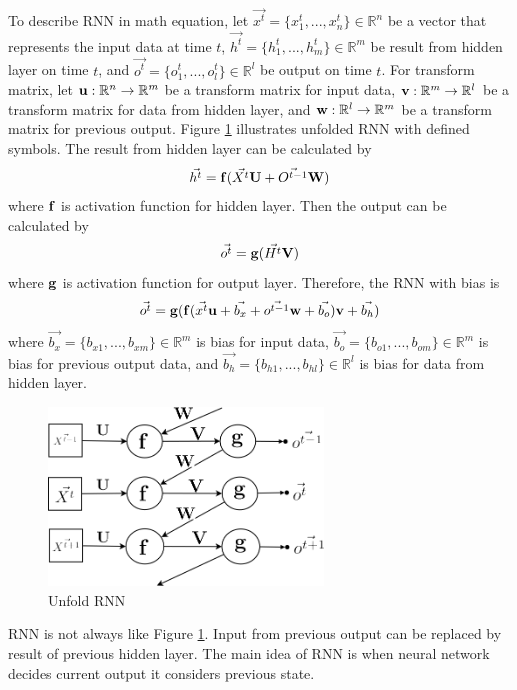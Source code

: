 \documentclass[draft,dvipsnames]{drexel-thesis}
\begin{document}
\begin{thesis}
	To describe RNN in math equation, let $\vec{x^t} = \{ x_1^t, ..., x_n^t\} \in \mathbb{R}^n$ be a vector that represents the input data at time $t$, $\vec{h^t} = \{ h_1^t, ..., h_m^t\} \in \mathbb{R}^m$ be result from hidden layer on time $t$, and $\vec{o^t} = \{ o_1^t, ..., o_l^t\} \in \mathbb{R}^l$ be output on time $t$. For transform matrix, let $\bold{u}: \mathbb{R}^n \rightarrow \mathbb{R}^m$ be a transform matrix for input data, $\bold{v}: \mathbb{R}^m \rightarrow \mathbb{R}^l$ be a transform matrix for data from hidden layer, and $\bold{w}: \mathbb{R}^l \rightarrow \mathbb{R}^m$ be a transform matrix for previous output. Figure \ref{fig:unfold_RNN} illustrates unfolded RNN with defined symbols. The result from hidden layer can be calculated by 
	$$\vec{h^t} = \bold{f}(\vec{X^t}\bold{U} + \vec{O^{t-1}}\bold{W})$$ where $\bold{f}$ is activation function for hidden layer. Then the output can be calculated by
	$$\vec{o^t} = \bold{g}(\vec{H^t}\bold{V})$$ where $\bold{g}$ is activation function for output layer. Therefore, the RNN with bias is
	$$\vec{o^t} = \bold{g}(\bold{f}(\vec{x^t}\bold{u}+\vec{b_x} + \vec{o^{t-1}}\bold{w}+\vec{b_o})\bold{v}+\vec{b_h})$$ where $\vec{b_x} = \{b_{x1}, ..., b_{xm}\} \in \mathbb{R}^m$ is bias for input data, $\vec{b_o} = \{b_{o1}, ..., b_{om}\} \in \mathbb{R}^m$ is bias for previous output data, and $\vec{b_h} = \{b_{h1}, ..., b_{hl}\} \in \mathbb{R}^l$ is bias for data from hidden layer. 
	
\begin{figure}[t!]
    \centering
    \includegraphics[width=0.65\textwidth]{pictures/figures/unfold_RNN.png}
    \caption{Unfold RNN}
    \label{fig:unfold_RNN}
\end{figure}

	RNN is not always like Figure \ref{fig:unfold_RNN}. Input from previous output can be replaced by result of previous hidden layer. The main idea of RNN is when neural network decides current output it considers previous state.
	

\end{thesis}
\end{document}
